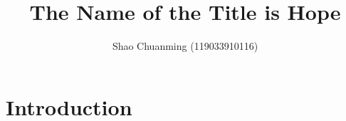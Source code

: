 \documentclass[sigconf]{acmart}
\begin{document}
\title{The Name of the Title is Hope}
\author{Shao Chuanming (119033910116)}

\begin{abstract}

\end{abstract}
\maketitle

\section{Introduction}




\end{document}
